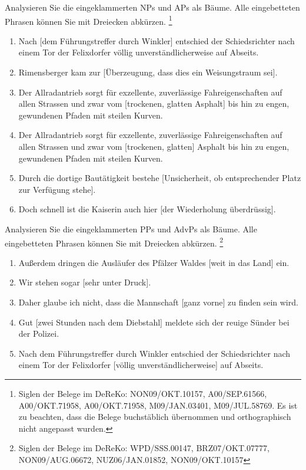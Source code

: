 \begin{sloppypar}

\Uebung \label{u111} Analysieren Sie die eingeklammerten NPs und APs als Bäume.
Alle eingebetteten Phrasen können Sie mit Dreiecken abkürzen.%
\footnote{Siglen der Belege im DeReKo: NON09\slash OKT.10157, A00\slash SEP.61566, A00\slash OKT.71958, A00\slash OKT.71958, M09\slash JAN.03401, M09\slash JUL.58769.
Es ist zu beachten, dass die Belege buchstäblich übernommen und orthographisch nicht angepasst wurden.}

\begin{enumerate}
  \item Nach [dem Führungstreffer durch Winkler] entschied der Schiedsrichter nach einem Tor der Felixdorfer völlig unverständlicherweise auf Abseits.
  \item Rimensberger kam zur [Überzeugung, dass dies ein Weisungstraum sei].
  \item Der Allradantrieb sorgt für exzellente, zuverlässige Fahreigenschaften auf allen Strassen und zwar vom [trockenen, glatten Asphalt] bis hin zu engen, gewundenen Pfaden mit steilen Kurven.
  \item Der Allradantrieb sorgt für exzellente, zuverlässige Fahreigenschaften auf allen Strassen und zwar vom [trockenen, glatten] Asphalt bis hin zu engen, gewundenen Pfaden mit steilen Kurven.
  \item Durch die dortige Bautätigkeit bestehe [Unsicherheit, ob entsprechender Platz zur Verfügung stehe].
  \item Doch schnell ist die Kaiserin auch hier [der Wiederholung überdrüssig].
\end{enumerate}

\Uebung \label{u112} Analysieren Sie die eingeklammerten PPs und AdvPs als Bäume.
Alle eingebetteten Phrasen können Sie mit Dreiecken abkürzen.%
\footnote{Siglen der Belege im DeReKo: WPD\slash SSS.00147, BRZ07\slash OKT.07777, NON09\slash AUG.06672, NUZ06\slash JAN.01852, NON09\slash OKT.10157}

\begin{enumerate}
  \item Außerdem dringen die Ausläufer des Pfälzer Waldes [weit in das Land] ein.
  \item Wir stehen sogar [sehr unter Druck].
  \item Daher glaube ich nicht, dass die Mannschaft [ganz vorne] zu finden sein wird.
  \item Gut [zwei Stunden nach dem Diebstahl] meldete sich der reuige Sünder bei der Polizei.
  \item Nach dem Führungstreffer durch Winkler entschied der Schiedsrichter nach einem Tor der Felixdorfer [völlig unverständlicherweise] auf Abseits.
\end{enumerate}


\end{sloppypar}
